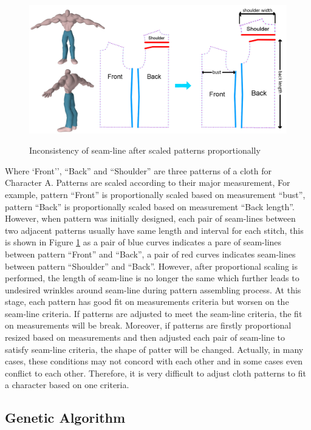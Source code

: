\begin{figure}[H]
	\centering
	\includegraphics[width=1\columnwidth]{../images/confict}\\[0.1cm]
    \caption{Inconsistency of seam-line after scaled patterns proportionally}
    \label{figure:confict}
\end{figure}

Where `Front'', ``Back'' and ``Shoulder'' are three patterns of a cloth for Character A. Patterns are scaled according to their major measurement, For example, pattern ``Front'' is proportionally scaled based on measurement ``bust'', pattern ``Back'' is proportionally scaled based on measurement ``Back length''. However, when pattern was initially designed, each pair of seam-lines between two adjacent patterns usually have same length and interval for each stitch, this is shown in Figure \ref{figure:confict} as a pair of blue curves indicates a pare of seam-lines between pattern ``Front'' and ``Back'', a pair of red curves indicates seam-lines between pattern ``Shoulder'' and ``Back''. However, after proportional scaling is performed, the length of seam-line is no longer the same which further leads to undesired wrinkles around seam-line during pattern assembling process.  At this stage, each pattern has good fit on measurements criteria but worsen on the seam-line criteria. If patterns are adjusted to meet the seam-line criteria, the fit on measurements will be break. Moreover, if patterns are firstly proportional resized based on measurements and then adjusted each pair of seam-line to satisfy seam-line criteria, the shape of patter will be changed. Actually, in many cases, these conditions may not concord with each other and in some cases even conflict to each other. Therefore, it is very difficult to adjust cloth patterns to fit a character based on one criteria.   


\subsection{Genetic Algorithm}

